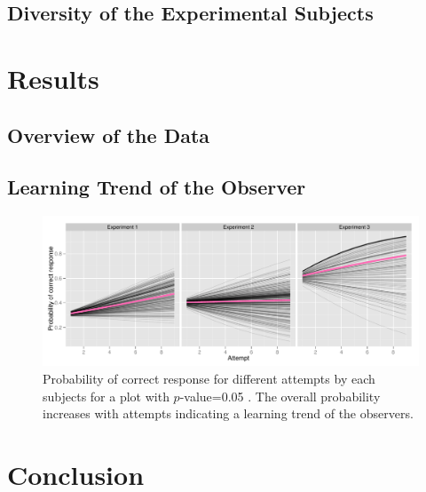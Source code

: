 \documentclass[10pt]{article}
\begin{document}
\subsection{Diversity of the Experimental Subjects}

\section{Results}
\subsection{Overview of the Data}
\subsection{Learning Trend of the Observer}


\begin{figure}[htbp] %
   \centering
   \includegraphics[width=6in]{learning_trend.pdf} 
   \caption{Probability of correct response for different attempts by each subjects for a plot with $p$-value=0.05 . The overall probability increases with attempts indicating a learning trend of the observers.}
   \label{fig:learning_trend}
\end{figure}

\section{Conclusion}




\end{document}
